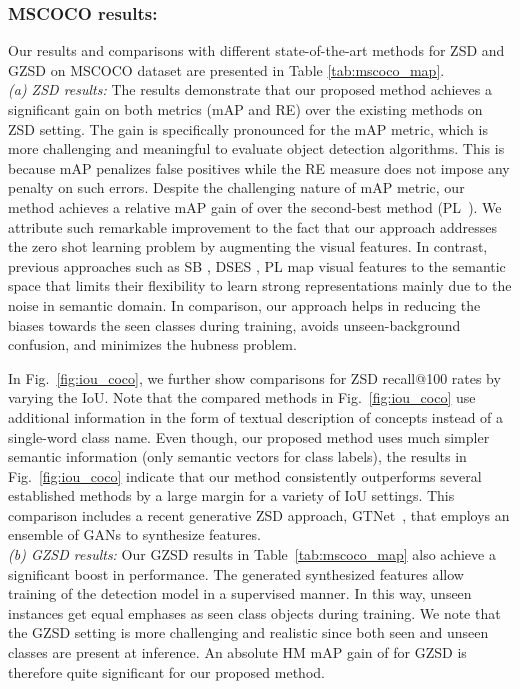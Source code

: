 \documentclass[runningheads]{llncs}
\begin{document}
\subsubsection{MSCOCO results:} Our results and comparisons with different state-of-the-art methods for ZSD and GZSD on MSCOCO dataset are presented in Table \ref{tab:mscoco_map}. \\
\emph{(a) ZSD results:} The results demonstrate that our proposed method achieves a significant gain on both metrics (mAP and RE) over the existing methods on ZSD setting. The gain is specifically  pronounced for the mAP metric, which is more challenging and meaningful to evaluate object detection algorithms. This is because mAP penalizes false positives while the RE measure does not impose any penalty on such errors. Despite the challenging nature of mAP metric, our method achieves a relative mAP gain of  over the second-best method (PL~\cite{rahman2018polarity}). We attribute such remarkable improvement to the fact that our approach addresses the zero shot learning problem by augmenting the visual features. In contrast, previous approaches such as SB \cite{bansal2018zero}, DSES \cite{bansal2018zero}, PL \cite{rahman2018polarity} map visual features to the semantic space that limits their flexibility to learn strong representations mainly due to the noise in semantic domain. In comparison, our approach helps in reducing the biases towards the seen classes during training, avoids unseen-background confusion, and minimizes the hubness problem. 

In Fig.~\ref{fig:iou_coco}, we further show comparisons for ZSD recall@100 rates by varying the IoU. Note that the compared methods in Fig.~\ref{fig:iou_coco} use additional information in the form of textual description of concepts instead of a single-word class name. Even though, our proposed method uses much simpler semantic information (only semantic vectors for class labels), the results in Fig.~\ref{fig:iou_coco} indicate that our method consistently outperforms several established methods by a large margin for a variety of IoU settings. This comparison includes a recent generative ZSD approach, GTNet~\cite{zhao2020gtnet}, that employs an ensemble of GANs to synthesize features. \\


\noindent\emph{(b) GZSD results:} Our GZSD results in Table~\ref{tab:mscoco_map} also achieve a significant boost in performance. The generated synthesized features allow training of the detection model in a supervised manner. In this way, unseen instances get equal emphases as seen class objects during training. We note that the GZSD setting is more challenging and realistic since both seen and unseen classes are present at inference. An absolute HM mAP gain of  for GZSD is therefore quite significant for our proposed method. 
\end{document}
